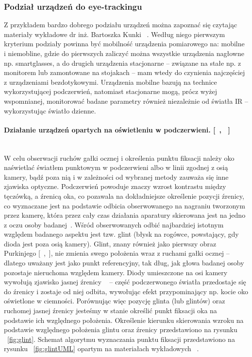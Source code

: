 \documentclass[twoside,a4paper]{book}
\begin{document}
\subsubsection{Podział urządzeń do eye-trackingu}

Z przykładem bardzo dobrego podziału urządzeń można zapoznać się czytając materiały wykładowe dr inż. Bartoszka Kunki ~\cite{kunkaFiksacja}. Według niego pierwszym kryterium podziały powinna być mobilność urządzenia pomiarowego na: mobilne i niemobline, gdzie do pierwszych zaliczyć można wszystkie urządzenia nagłowne np. smartglasses, a do drugich urządzenia stacjonarne – związane na stałe np. z monitorem lub zamontowane na stojakach – mam wtedy do czynienia najczęściej z urządzeniami bezdotykowymi. Urządzenia mobilne bazują na technice wykorzystującej podczerwień, natomiast stacjonarne mogą, prócz wyżej wspomnianej, monitorować badane parametry również niezależnie od światła  IR – wykorzystując światło dzienne. 

\paragraph{Działanie urządzeń opartych na oświetleniu w podczerwieni. [~\cite{kunkaFiksacja}, ~\cite{erica}]}\leavevmode\\
W celu obserwacji ruchów gałki ocznej i określenia punktu fiksacji należy oko naświetlać światłem punktowym w podczerwieni albo w linii zgodnej z osią kamery, bądź poza nią i w zależności od wybranej metody zauważa się inne zjawiska optyczne. Podczerwień powoduje znaczy wzrost kontrastu między tęczówką, a źrenicą oka, co pozawala na dokładniejsze określenie pozycji źrenicy, co wyznaczane jest na podstawie odbicia obserwowanego na nagraniu tworzonym przez kamerę, która przez cały czas działania aparatury  skierowana jest na jedno z oczu osoby badanej~\cite{erica}.
Wśród obserwowanych odbić najbardziej istotnym względem badanego aspektu jest tzw. glint (błysk na rogówce, powstający, gdy dioda jest poza osią kamery). Glint, znany również jako  pierwszy obraz Purkinjego [~\cite{kunkaFiksacja},~\cite{erica}], nie zmienia swego położenia wraz z ruchami gałki ocznej – dlatego uważany jest jako punkt referencyjny, tak dług, jak głowa badanej osoby pozostaje nieruchoma względem kamery.  Diody umieszczone na osi kamery wywołują zjawisko jasnej źrenicy ~\cite{kunkaFiksacja} – część podczerwonego światła przedostaje się do źrenicy i zostaje od niej odbita, wywołując efekt  przypominający np. kocie oko oświetlone w ciemności.  Porównując więc pozycję glinta (lub glintów) oraz ruchomej jasnej źrenicy jesteśmy w stanie określić punkt fiksacji oka na podstawie ich względnego położenia. Określenie kierunku skierowania wzroku na podstawie względnego położenia glintu oraz źrenicy przedstawiono na rysunku  ~\ref{fig:glint}. Schemat algorytmu wyznaczania punktu fiksacji przedstawiono na rysunku ~\ref{fig:glintUML} opartym na materiałach wykładowych ~\cite{kunkaFiksacja}.
\end{document}

